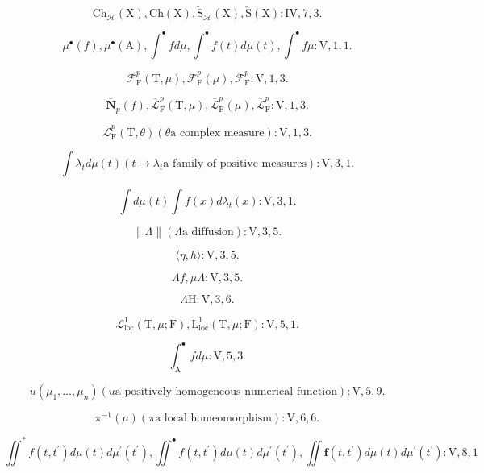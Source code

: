 \[
\mathrm{Ch} _ {\mathcal {H}} (\mathrm{X}), \mathrm{Ch} (\mathrm{X}), \check {\mathrm{S}} _ {\mathcal {H}} (\mathrm{X}), \check {\mathrm{S}} (\mathrm{X}): \mathrm{IV}, 7, 3.
\]

\[
\mu^ {\bullet} (f), \mu^ {\bullet} (\mathrm{A}), \int^ {\bullet} f d \mu , \int^ {\bullet} f (t) d \mu (t), \int^ {\bullet} f \mu : \mathrm{V}, 1, 1.
\]

\[
\overline {{\mathcal {F}}} _ {\mathrm{F}} ^ {p} (\mathrm{T}, \mu), \overline {{\mathcal {F}}} _ {\mathrm{F}} ^ {p} (\mu), \overline {{\mathcal {F}}} _ {\mathrm{F}} ^ {p}: \mathrm{V}, 1, 3.
\]

\[
\overline {{\mathbf {N}}} _ {p} (f), \overline {{\mathcal {L}}} _ {\mathrm{F}} ^ {p} (\mathrm{T}, \mu), \overline {{\mathcal {L}}} _ {\mathrm{F}} ^ {p} (\mu), \overline {{\mathcal {L}}} _ {\mathrm{F}} ^ {p}: \mathrm{V}, 1, 3.
\]

\[
\overline {{\mathcal {L}}} _ {\mathrm{F}} ^ {p} (\mathrm{T}, \theta) (\theta \text {a complex measure}): \mathrm{V,1,3.}
\]

\[
\int \lambda_ {t} d \mu (t) (t \mapsto \lambda_ {t} \text {a family of positive measures}): \mathrm{V}, 3, 1.
\]

\[
\int d \mu (t) \int f (x) d \lambda_ {t} (x): \mathrm{V}, 3, 1.
\]

\[
\| \Lambda \| (\Lambda \text {a diffusion}): \mathrm{V}, 3, 5.
\]

\[
\langle \eta , h \rangle : \mathrm{V}, 3, 5.
\]

\[
\Lambda f, \mu \Lambda : \mathrm{V}, 3, 5.
\]

\[
\Lambda \mathrm{H}: \mathrm{V}, 3, 6.
\]

\[
\mathcal {L} _ {\mathrm{loc}} ^ {1} (\mathrm{T}, \mu ; \mathrm{F}), \mathrm{L} _ {\mathrm{loc}} ^ {1} (\mathrm{T}, \mu ; \mathrm{F}): \mathrm{V}, 5, 1.
\]

\[
\int_ {\mathrm{A}} ^ {\bullet} f d \mu : \mathrm{V}, 5, 3.
\]

\[
u (\mu_ {1}, \dots , \mu_ {n}) (u \text {a positively homogeneous numerical function}): \mathrm{V}, 5, 9.
\]

\[
\pi^ {- 1} (\mu) (\pi \text {a local homeomorphism}) \colon \mathrm{V,6,6.}
\]

\[
\iint^ {*} f (t, t ^ {\prime}) d \mu (t) d \mu^ {\prime} (t ^ {\prime}), \iint^ {\bullet} f (t, t ^ {\prime}) d \mu (t) d \mu^ {\prime} (t ^ {\prime}), \iint \mathbf {f} (t, t ^ {\prime}) d \mu (t) d \mu^ {\prime} (t ^ {\prime}): \mathrm{V}, 8, 1
\]


